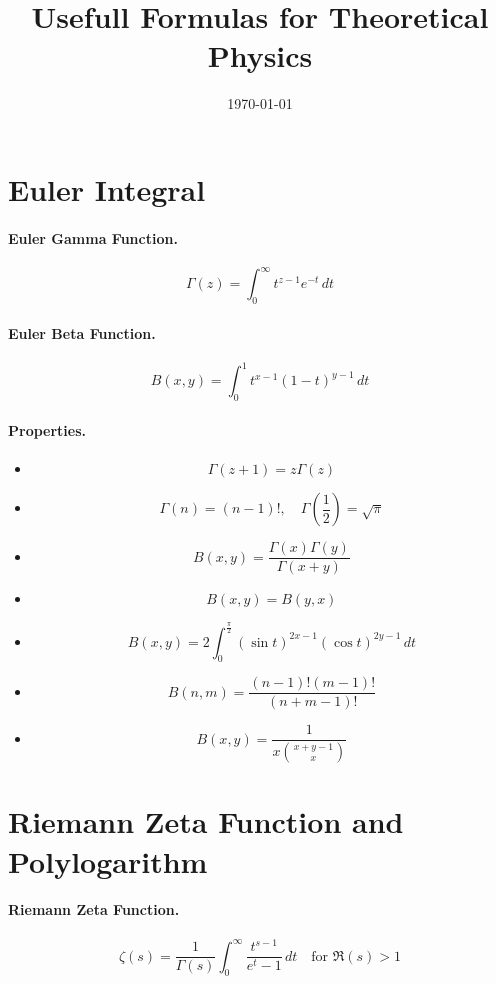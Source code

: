 \documentclass{article}
\begin{document}
\title{Usefull Formulas for Theoretical Physics}
\date{\today}
\maketitle


\section{Euler Integral}
\paragraph{Euler Gamma Function.}
\[
\Gamma(z) = \int_{0}^{\infty} t^{z-1} e^{-t} \, dt
\]
\paragraph{Euler Beta Function.}
\[
B(x, y) = \int_{0}^{1} t^{x-1} (1-t)^{y-1} \, dt
\]
\paragraph{Properties.}
\begin{itemize}
    \item 
    \[
    \Gamma(z+1) = z \Gamma(z)
    \]
    \item 
    \[
    \Gamma(n) = (n-1)!, \quad \Gamma\left(\frac{1}{2}\right) = \sqrt{\pi}
    \]
    \item 
    \[
    B(x, y) = \frac{\Gamma(x)\Gamma(y)}{\Gamma(x+y)}
    \]
    \item 
    \[
    B(x, y) = B(y, x)
    \]
    \item
    \[
    B(x, y) = 2 \int_{0}^{\frac{\pi}{2}} (\sin t)^{2x-1} (\cos t)^{2y-1} \, dt
    \]
    \item
    \[
    B(n, m) = \frac{(n-1)!(m-1)!}{(n+m-1)!}
    \]
    \item 
    \[
    B(x, y) = \frac{1}{x \binom{x+y-1}{x}}
    \]
\end{itemize}

\section{Riemann Zeta Function and Polylogarithm}
\paragraph{Riemann Zeta Function.}
\[
\zeta(s) = \frac{1}{\Gamma(s)} \int_{0}^{\infty} \frac{t^{s-1}}{e^t - 1} \, dt \quad \text{for } \Re(s) > 1
\]
\end{document}
